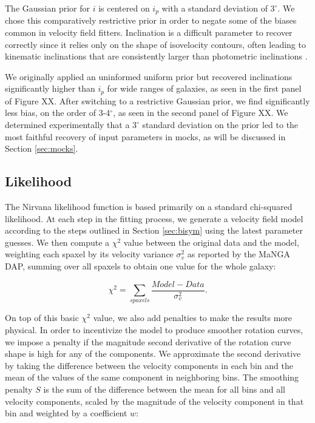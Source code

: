 The Gaussian prior for $i$ is centered on $i_p$ with a standard deviation of $3^\circ$. We chose this comparatively restrictive prior in order to negate some of the biases common in velocity field fitters. Inclination is a difficult parameter to recover correctly since it relies only on the shape of isovelocity contours, often leading to kinematic inclinations that are consistently larger than photometric inclinations \citep[e.g.][and our own axisymmetric model]{andersen2013}. 

We originally applied an uninformed uniform prior but recovered inclinations significantly higher than $i_p$ for wide ranges of galaxies, as seen in the first panel of Figure XX. After switching to a restrictive Gaussian prior, we find significantly less bias, on the order of 3-4$^\circ$, as seen  in the second panel of Figure XX. We determined experimentally that a $3^\circ$ standard deviation on the prior led to the most faithful recovery of input parameters in mocks, as will be discussed in Section \ref{sec:mocks}.

\subsection{Likelihood} \label{sec:likelihood}
The Nirvana likelihood function is based primarily on a standard chi-squared likelihood. At each step in the fitting process, we generate a velocity field model according to the steps outlined in Section \ref{sec:bisym} using the latest parameter guesses. We then compute a $\chi^2$ value between the original data and the model, weighting each spaxel by its velocity variance $\sigma_v^2$ as reported by the MaNGA DAP, summing over all spaxels to obtain one value for the whole galaxy:

\begin{equation} \label{chisq}
    \chi^2 = \sum_{spaxels} \frac{Model - Data}{\sigma_v^2}.
\end{equation}

On top of this basic $\chi^2$ value, we also add penalties to make the results more physical. In order to incentivize the model to produce smoother rotation curves, we impose a penalty if the magnitude second derivative of the rotation curve shape is high for any of the components. We approximate the second derivative by taking the difference between the velocity components in each bin and the mean of the values of the same component in neighboring bins. The smoothing penalty $S$ is the sum of the difference between the mean for all bins and all velocity components, scaled by the magnitude of the velocity component in that bin and weighted by a coefficient  $w$:


